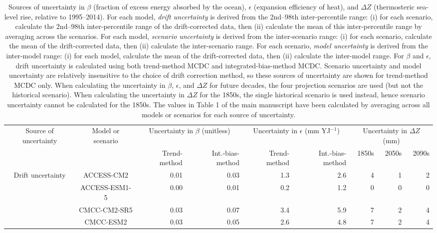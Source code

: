 \begin{table*}[t]
\centering
\caption{Sources of uncertainty in $\beta$ (fraction of excess energy absorbed by the ocean), $\epsilon$ (expansion efficiency of heat), and ${\Delta}Z$ (thermosteric sea-level rise, relative to 1995--2014). For each model, \emph{drift uncertainty} is derived from the 2nd--98th inter-percentile range: (i) for each scenario, calculate the 2nd--98th inter-percentile range of the drift-corrected data, then (ii) calculate the mean of this inter-percentile range by averaging across the scenarios. For each model, \emph{scenario uncertainty} is derived from the inter-scenario range: (i) for each scenario, calculate the mean of the drift-corrected data, then (ii) calculate the inter-scenario range. For each scenario, \emph{model uncertainty} is derived from the inter-model range: (i) for each model, calculate the mean of the drift-corrected data, then (ii) calculate the inter-model range. For $\beta$ and $\epsilon$, drift uncertainty is calculated using both trend-method MCDC and integrated-bias-method MCDC. Scenario uncertainty and model uncertainty are relatively insensitive to the choice of drift correction method, so these sources of uncertainty are shown for trend-method MCDC only. When calculating the uncertainty in $\beta$, $\epsilon$, and ${\Delta}Z$ for future decades, the four projection scenarios are used (but not the historical scenario). When calculating the uncertainty in ${\Delta}Z$ for the 1850s, the single historical scenario is used instead, hence scenario uncertainty cannot be calculated for the 1850s. The values in Table 1 of the main manuscript have been calculated by averaging across all models or scenarios for each source of uncertainty.}
\begin{tabular}{c|c|rr|rr|rrr}
\toprule
Source of uncertainty & Model or scenario & \multicolumn{2}{c|}{Uncertainty in $\beta$ (unitless)} & \multicolumn{2}{c|}{Uncertainty in $\epsilon$ (mm YJ$^{-1}$)} & \multicolumn{3}{c}{Uncertainty in ${\Delta}Z$ (mm)} \\
 &  & Trend-method & Int.-bias-method & Trend-method & Int.-bias-method & 1850s & 2050s & 2090s \\
\midrule
\multirow[c]{16}{*}{Drift uncertainty} & ACCESS-CM2 & 0.01 & 0.03 & 1.3 & 2.6 & 4 & 1 & 2 \\
 & ACCESS-ESM1-5 & 0.00 & 0.01 & 0.2 & 1.2 & 0 & 0 & 0 \\
 & CMCC-CM2-SR5 & 0.03 & 0.07 & 3.4 & 5.9 & 7 & 2 & 4 \\
 & CMCC-ESM2 & 0.03 & 0.05 & 2.6 & 4.8 & 7 & 2 & 4 \\

\end{tabular}
\end{table*}
